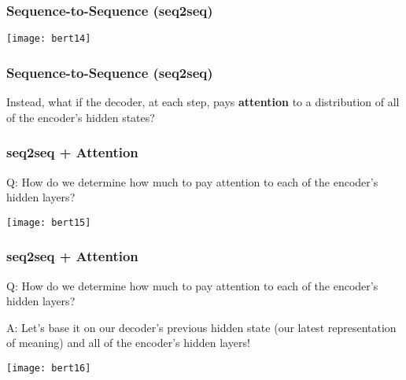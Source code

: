\begin{frame}[fragile]\frametitle{Sequence-to-Sequence (seq2seq)}

\begin{center}
\texttt{[image: bert14]}
\end{center}	

\end{frame}

\begin{frame}[fragile]\frametitle{Sequence-to-Sequence (seq2seq)}

\begin{center}
Instead, what if the decoder, at each step, pays {\bf attention} to a distribution of all of the encoder’s hidden states?
\end{center}	

\end{frame}

\begin{frame}[fragile]\frametitle{seq2seq + Attention}

Q: How do we determine how much to pay attention to each of the encoder’s hidden layers? 

\begin{center}
\texttt{[image: bert15]}
\end{center}	

\end{frame}


\begin{frame}[fragile]\frametitle{seq2seq + Attention}

Q: How do we determine how much to pay attention to each of the encoder’s hidden layers? 

A: Let’s base it on our decoder’s previous hidden state (our latest representation of meaning) and all of the encoder’s hidden layers!


\begin{center}
\texttt{[image: bert16]}
\end{center}	

\end{frame}



